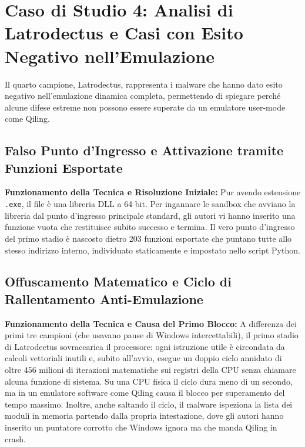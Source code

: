 \documentclass[11pt, a4paper]{article}
\begin{document}
	\section{Caso di Studio 4: Analisi di Latrodectus e Casi con Esito Negativo nell'Emulazione}
	
	Il quarto campione, Latrodectus, rappresenta i malware che hanno dato esito negativo nell'emulazione dinamica completa, permettendo di spiegare perché alcune difese estreme non possono essere superate da un emulatore user-mode come Qiling.
	
	\subsection{Falso Punto d'Ingresso e Attivazione tramite Funzioni Esportate}
	
	\textbf{Funzionamento della Tecnica e Risoluzione Iniziale:} Pur avendo estensione \texttt{.exe}, il file è una libreria DLL a 64 bit. Per ingannare le sandbox che avviano la libreria dal punto d'ingresso principale standard, gli autori vi hanno inserito una funzione vuota che restituisce subito successo e termina. Il vero punto d'ingresso del primo stadio è nascosto dietro 203 funzioni esportate che puntano tutte allo stesso indirizzo interno, individuato staticamente e impostato nello script Python.
	
	\subsection{Offuscamento Matematico e Ciclo di Rallentamento Anti-Emulazione}
	
	\textbf{Funzionamento della Tecnica e Causa del Primo Blocco:} A differenza dei primi tre campioni (che usavano pause di Windows intercettabili), il primo stadio di Latrodectus sovraccarica il processore: ogni istruzione utile è circondata da calcoli vettoriali inutili e, subito all'avvio, esegue un doppio ciclo annidato di oltre 456 milioni di iterazioni matematiche sui registri della CPU senza chiamare alcuna funzione di sistema. Su una CPU fisica il ciclo dura meno di un secondo, ma in un emulatore software come Qiling causa il blocco per superamento del tempo massimo. Inoltre, anche saltando il ciclo, il malware ispeziona la lista dei moduli in memoria partendo dalla propria intestazione, dove gli autori hanno inserito un puntatore corrotto che Windows ignora ma che manda Qiling in crash.
	
\end{document}
